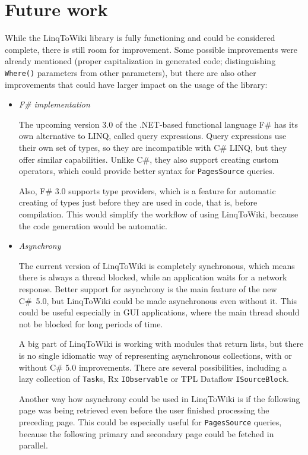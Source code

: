\chapter{Future work}


While the LinqToWiki library is fully functioning and could be considered complete,
there is still room for improvement.
Some possible improvements were already mentioned
(proper capitalization in generated code;
distinguishing \lstinline{Where()} parameters from other parameters),
but there are also other improvements that could have larger impact on the usage of the library:

\begin{itemize}
\item \emph{F\# implementation}

The upcoming version 3.0 of the .NET-based functional language F\# has its own alternative to \ac{LINQ},
called query expressions.
Query expressions use their own set of types, so they are incompatible with C\# \ac{LINQ},
but they offer similar capabilities.
Unlike C\#, they also support creating custom operators,
which could provide better syntax for \lstinline{PagesSource} queries.

Also, F\# 3.0 supports type providers, which is a feature for automatic creating of types
just before they are used in code, that is, before compilation.
This would simplify the workflow of using LinqToWiki, because the code generation would be automatic.

\item \emph{Asynchrony}

The current version of LinqToWiki is completely synchronous,
which means there is always a thread blocked, while an application waits for a network response.
Better support for asynchrony is the main feature of the new C\#~5.0,
but LinqToWiki could be made asynchronous even without it.
This could be useful especially in \ac{GUI} applications, where the main thread should not be blocked for long periods of time.

A big part of LinqToWiki is working with modules that return lists,
but there is no single idiomatic way of representing asynchronous collections,
with or without C\# 5.0 improvements.
There are several possibilities, including a lazy collection of \lstinline{Task}s,
\acs{Rx} \lstinline{IObservable} or \acs{TPL} Dataflow \lstinline{ISourceBlock}.

Another way how asynchrony could be used in LinqToWiki is if the following page was being retrieved
even before the user finished processing the preceding page.
This could be especially useful for \lstinline{PagesSource} queries,
because the following primary and secondary page could be fetched in parallel.


\end{itemize}
